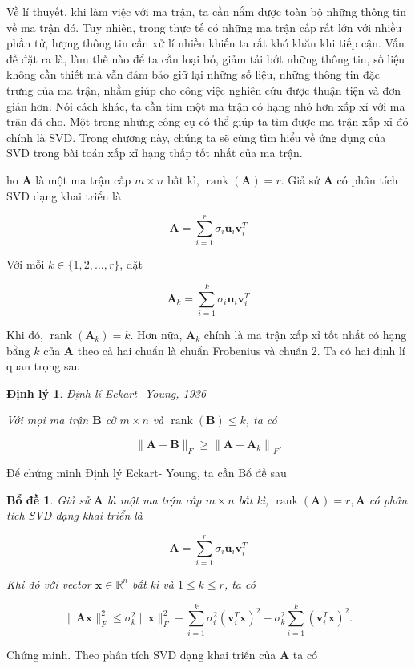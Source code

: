 \documentclass[12pt,a4paper,oneside]{report}
\newtheorem{dl}{Định lý}[section]
\newtheorem{bd}{Bổ đề} [section]
\numberwithin{equation}{section}
\begin{document}
Về lí thuyết, khi làm việc với ma trận, ta cần nắm được toàn bộ những thông tin về ma trận đó. Tuy nhiên, trong thực tế có những ma trận cấp rất lớn với nhiều phần tử, lượng thông tin cần xử lí nhiều khiến ta rất khó khăn khi tiếp cận. Vấn đề đặt ra là, làm thế nào để ta cần loại bỏ, giảm tải bớt những thông tin, số liệu không cần thiết mà vẫn đảm bảo giữ lại những số liệu, những thông tin đặc trưng của ma trận, nhằm giúp cho công việc nghiên cứu được thuận tiện và đơn giản hơn. Nói cách khác, ta cần tìm một ma trận có hạng nhỏ hơn xấp xỉ với ma trận đã cho. Một trong những công cụ có thể giúp ta tìm được ma trận xấp xỉ đó chính là SVD. Trong chương này, chúng ta sẽ cùng tìm hiểu về ứng dụng của SVD trong bài toán xấp xỉ hạng thấp tốt nhất của ma trận. 

ho $\mathbf{A}$ là một ma trận cấp $m \times n$ bất kì, $\operatorname{rank}(\mathbf{A})=r$. Giả sử $\mathbf{A}$ có phân tích SVD dạng khai triển là

$$
\mathbf{A}=\sum_{i=1}^{r} \sigma_{i} \mathbf{u}_{i} \mathbf{v}_{i}^{T}
$$

Với mỗi $k \in\{1,2, \ldots, r\}$, dặt

$$
\mathbf{A}_{k}=\sum_{i=1}^{k} \sigma_{i} \mathbf{u}_{i} \mathbf{v}_{i}^{T}
$$

Khi đó, $\operatorname{rank}\left(\mathbf{A}_{k}\right)=k$. Hơn nữa, $\mathbf{A}_{k}$ chính là ma trận xấp xỉ tốt nhất có hạng bằng $k$ của $\mathbf{A}$ theo cả hai chuẩn là chuẩn Frobenius và chuẩn 2. Ta có hai định lí quan trọng sau

\begin{dl}{Định lí Eckart- Young, 1936}

Với mọi ma trận $\mathbf{B}$ cỡ $m \times n$ và $\operatorname{rank}(\mathbf{B}) \leqslant k$, ta có

$$
\|\mathbf{A}-\mathbf{B}\|_{F} \geqslant\left\|\mathbf{A}-\mathbf{A}_{k}\right\|_{F} .
$$
\end{dl}
Để chứng minh Định lý Eckart- Young, ta cần Bổ đề sau

\begin{bd} Giả sử $\mathbf{A}$ là một ma trận cấp $m \times n$ bất kì, $\operatorname{rank}(\mathbf{A})=r, \mathbf{A}$ có phân tích SVD dạng khai triển là

$$
\mathbf{A}=\sum_{i=1}^{r} \sigma_{i} \mathbf{u}_{i} \mathbf{v}_{i}^{T}
$$

Khi đó với vector $\mathbf{x} \in \mathbb{R}^{n}$ bất kì và $1 \leqslant k \leqslant r$, ta có

$$
\|\mathbf{A} \mathbf{x}\|_{F}^{2} \leqslant \sigma_{k}^{2}\|\mathbf{x}\|_{F}^{2}+\sum_{i=1}^{k} \sigma_{i}^{2}\left(\mathbf{v}_{i}^{T} \mathbf{x}\right)^{2}-\sigma_{k}^{2} \sum_{i=1}^{k}\left(\mathbf{v}_{i}^{T} \mathbf{x}\right)^{2} .
$$
\end{bd}
Chứng minh. Theo phân tích SVD dạng khai triển của $\mathbf{A}$ ta có
\end{document}

